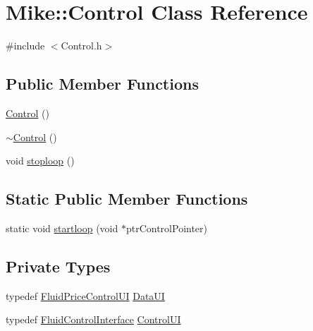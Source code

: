 \hypertarget{class_mike_1_1_control}{}\section{Mike\+:\+:Control Class Reference}
\label{class_mike_1_1_control}


{\ttfamily \#include $<$Control.\+h$>$}

\subsection*{Public Member Functions}
\begin{DoxyCompactItemize}
\item 
\hyperlink{class_mike_1_1_control_ac9a2e3b56773b1eadab7297327a9fbcc}{Control} ()
\item 
\hyperlink{class_mike_1_1_control_aa3395e0509ab5b980732ab0e3a29ce4d}{$\sim$\+Control} ()
\item 
void \hyperlink{class_mike_1_1_control_aa26389eedd6e1c60fa64fe7883ce6ce8}{stoploop} ()
\end{DoxyCompactItemize}
\subsection*{Static Public Member Functions}
\begin{DoxyCompactItemize}
\item 
static void \hyperlink{class_mike_1_1_control_ae34c60ef30c2de2332df13b644c7791f}{startloop} (void $\ast$ptr\+Control\+Pointer)
\end{DoxyCompactItemize}
\subsection*{Private Types}
\begin{DoxyCompactItemize}
\item 
typedef \hyperlink{class_fluid_price_control_u_i}{Fluid\+Price\+Control\+UI} \hyperlink{class_mike_1_1_control_addbe39ef40982f0a4002b6f74091a799}{Data\+UI}
\item 
typedef \hyperlink{class_fluid_control_interface}{Fluid\+Control\+Interface} \hyperlink{class_mike_1_1_control_aba56a17e2d16d087731d215476fff47d}{Control\+UI}
\end{DoxyCompactItemize}
